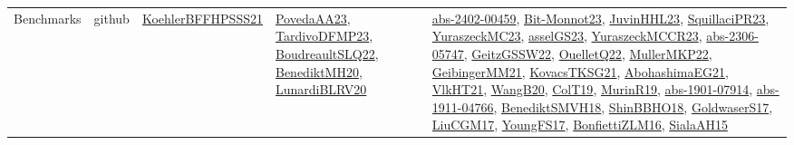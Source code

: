 {\begin{longtable}{llp{6cm}p{6cm}p{6cm}}
Benchmarks & github & \href{articles/KoehlerBFFHPSSS21.pdf}{KoehlerBFFHPSSS21}\cite{KoehlerBFFHPSSS21} & \href{papers/PovedaAA23.pdf}{PovedaAA23}\cite{PovedaAA23}, \href{papers/TardivoDFMP23.pdf}{TardivoDFMP23}\cite{TardivoDFMP23}, \href{papers/BoudreaultSLQ22.pdf}{BoudreaultSLQ22}\cite{BoudreaultSLQ22}, \href{articles/BenediktMH20.pdf}{BenediktMH20}\cite{BenediktMH20}, \href{articles/LunardiBLRV20.pdf}{LunardiBLRV20}\cite{LunardiBLRV20} & \href{articles/abs-2402-00459.pdf}{abs-2402-00459}\cite{abs-2402-00459}, \href{papers/Bit-Monnot23.pdf}{Bit-Monnot23}\cite{Bit-Monnot23}, \href{papers/JuvinHHL23.pdf}{JuvinHHL23}\cite{JuvinHHL23}, \href{papers/SquillaciPR23.pdf}{SquillaciPR23}\cite{SquillaciPR23}, \href{papers/YuraszeckMC23.pdf}{YuraszeckMC23}\cite{YuraszeckMC23}, \href{papers/asselGS23.pdf}{asselGS23}\cite{asselGS23}, \href{articles/YuraszeckMCCR23.pdf}{YuraszeckMCCR23}\cite{YuraszeckMCCR23}, \href{articles/abs-2306-05747.pdf}{abs-2306-05747}\cite{abs-2306-05747}, \href{papers/GeitzGSSW22.pdf}{GeitzGSSW22}\cite{GeitzGSSW22}, \href{papers/OuelletQ22.pdf}{OuelletQ22}\cite{OuelletQ22}, \href{articles/MullerMKP22.pdf}{MullerMKP22}\cite{MullerMKP22}, \href{papers/GeibingerMM21.pdf}{GeibingerMM21}\cite{GeibingerMM21}, \href{papers/KovacsTKSG21.pdf}{KovacsTKSG21}\cite{KovacsTKSG21}, \href{articles/AbohashimaEG21.pdf}{AbohashimaEG21}\cite{AbohashimaEG21}, \href{articles/VlkHT21.pdf}{VlkHT21}\cite{VlkHT21}, \href{papers/WangB20.pdf}{WangB20}\cite{WangB20}, \href{papers/ColT19.pdf}{ColT19}\cite{ColT19}, \href{papers/MurinR19.pdf}{MurinR19}\cite{MurinR19}, \href{articles/abs-1901-07914.pdf}{abs-1901-07914}\cite{abs-1901-07914}, \href{articles/abs-1911-04766.pdf}{abs-1911-04766}\cite{abs-1911-04766}, \href{papers/BenediktSMVH18.pdf}{BenediktSMVH18}\cite{BenediktSMVH18}, \href{articles/ShinBBHO18.pdf}{ShinBBHO18}\cite{ShinBBHO18}, \href{papers/GoldwaserS17.pdf}{GoldwaserS17}\cite{GoldwaserS17}, \href{papers/LiuCGM17.pdf}{LiuCGM17}\cite{LiuCGM17}, \href{papers/YoungFS17.pdf}{YoungFS17}\cite{YoungFS17}, \href{papers/BonfiettiZLM16.pdf}{BonfiettiZLM16}\cite{BonfiettiZLM16}, \href{papers/SialaAH15.pdf}{SialaAH15}\cite{SialaAH15}\\

\end{longtable}}

